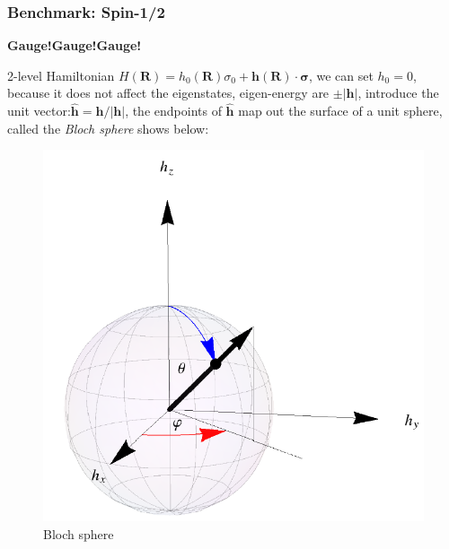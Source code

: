 \documentclass[letterpaper,10pt,english]{sphinxmanual}
\begin{document}
\subsubsection{Benchmark: Spin-1/2}
\label{TI/Lecture notes/2:benchmark-spin-1-2}
\textbf{Gauge!Gauge!Gauge!}

2-level Hamiltonian
\(H(\mathbf{R})=h_0(\mathbf{R})\sigma_0+\mathbf{h}(\mathbf{R})\cdot\mathbf{\sigma}\), we
can set \(h_0=0\), because it does not affect the eigenstates,
eigen-energy are \(\pm|\mathbf{h}|\), introduce the unit
vector:\(\hat{\mathbf{h}}=\mathbf{h}/|\mathbf{h}|\), the endpoints of
\(\hat{\mathbf{h}}\) map out the surface of a unit sphere, called the
\emph{Bloch sphere} shows below:
\begin{figure}[htbp]
\centering
\capstart

\includegraphics[width=0.700\linewidth]{11.png}
\caption{Bloch sphere}\end{figure}
\end{document}
